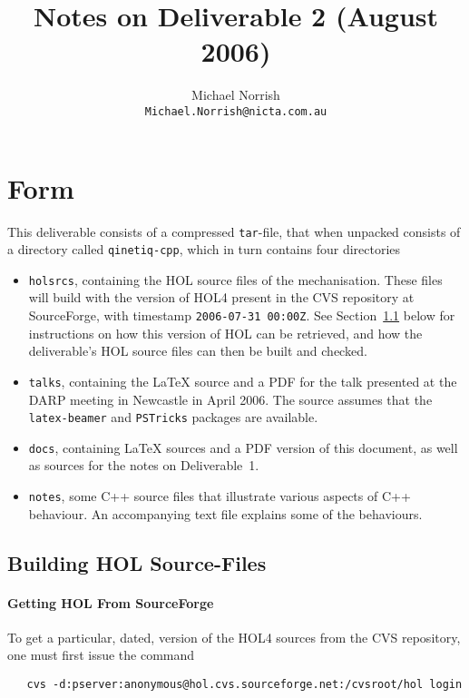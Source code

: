 \documentclass[11pt]{article}
\title{Notes on Deliverable 2 (August 2006)}
\author{Michael Norrish\\{\small \texttt{Michael.Norrish@nicta.com.au}}}
\date{}
\begin{document}
\maketitle

\section{Form}

This deliverable consists of a compressed \texttt{tar}-file, that when
unpacked consists of a directory called \texttt{qinetiq-cpp}, which in
turn contains four directories
\begin{itemize}
\item \texttt{holsrcs}, containing the HOL source files of the
  mechanisation.  These files will build with the version of HOL4
  present in the CVS repository at SourceForge, with timestamp
  \texttt{2006-07-31 00:00Z}.  See Section~\ref{sec:getting-hol}
  below for instructions on how this version of HOL can be retrieved,
  and how the deliverable's HOL source files can then be built and
  checked.
\item \texttt{talks}, containing the \LaTeX{} source and a PDF for the
  talk presented at the DARP meeting in Newcastle in April 2006.  The
  source assumes that the \texttt{latex-beamer} and \texttt{PSTricks}
  packages are available.
\item \texttt{docs}, containing \LaTeX{} sources and a PDF version of
  this document, as well as sources for the notes on Deliverable~1.
\item \texttt{notes}, some C++ source files that illustrate various
  aspects of C++ behaviour.  An accompanying text file explains some
  of the behaviours.
\end{itemize}

\subsection{Building HOL Source-Files}
\label{sec:getting-hol}

\paragraph{Getting HOL From SourceForge}

To get a particular, dated, version of the HOL4 sources from the CVS
repository, one must first issue the command

{\small
\begin{verbatim}
   cvs -d:pserver:anonymous@hol.cvs.sourceforge.net:/cvsroot/hol login
\end{verbatim}
}
\end{document}
